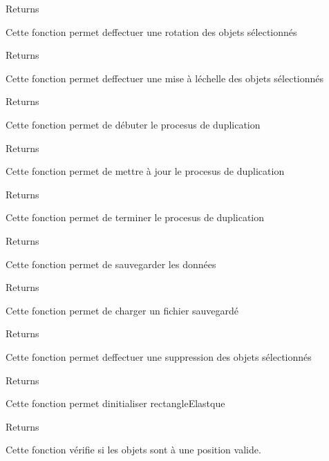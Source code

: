 \begin{DoxyReturn}{Returns}

\end{DoxyReturn}
Cette fonction permet d\textquotesingle{}effectuer une rotation des objets sélectionnés

\begin{DoxyReturn}{Returns}

\end{DoxyReturn}
Cette fonction permet d\textquotesingle{}effectuer une mise à l\textquotesingle{}échelle des objets sélectionnés

\begin{DoxyReturn}{Returns}

\end{DoxyReturn}
Cette fonction permet de débuter le procesus de duplication

\begin{DoxyReturn}{Returns}

\end{DoxyReturn}
Cette fonction permet de mettre à jour le procesus de duplication

\begin{DoxyReturn}{Returns}

\end{DoxyReturn}
Cette fonction permet de terminer le procesus de duplication

\begin{DoxyReturn}{Returns}

\end{DoxyReturn}
Cette fonction permet de sauvegarder les données

\begin{DoxyReturn}{Returns}

\end{DoxyReturn}
Cette fonction permet de charger un fichier sauvegardé

\begin{DoxyReturn}{Returns}

\end{DoxyReturn}
Cette fonction permet d\textquotesingle{}effectuer une suppression des objets sélectionnés

\begin{DoxyReturn}{Returns}

\end{DoxyReturn}
Cette fonction permet d\textquotesingle{}initialiser rectangle\+Elastque

\begin{DoxyReturn}{Returns}

\end{DoxyReturn}
Cette fonction vérifie si les objets sont à une position valide.

